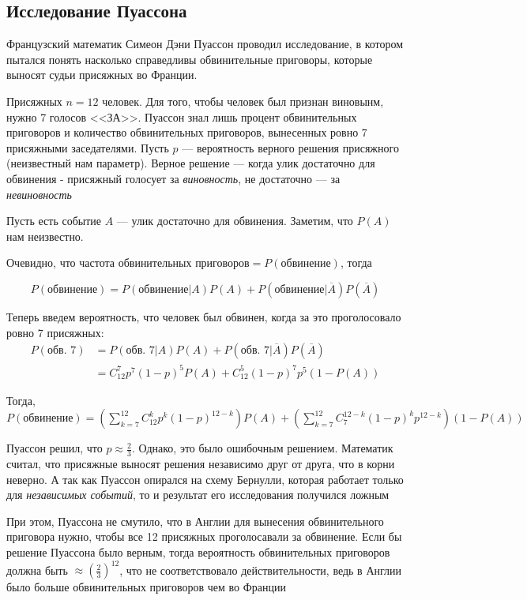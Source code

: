 \documentclass[a4paper, 10pt]{article}
\begin{document}
\subsection{Исследование Пуассона}
Французский математик Симеон Дэни Пуассон проводил исследование, в котором пытался понять насколько справедливы обвинительные приговоры, которые выносят судьи присяжных во Франции.

Присяжных $n=12$ человек. Для того, чтобы человек был признан виновынм, нужно 7 голосов <<ЗА>>. Пуассон знал лишь процент обвинительных приговоров и количество обвинительных приговоров, вынесенных ровно 7 присяжными заседателями. Пусть $p$ — вероятность верного решения присяжного (неизвестный нам параметр). Верное решение — когда улик достаточно для обвинения - присяжный голосует за \textit{виновность}, не достаточно — за \textit{невиновность}

Пусть есть событие $A$ — улик достаточно для обвинения. Заметим, что $P(A)$ нам неизвестно.

Очевидно, что частота обвинительных приговоров$=P(\text{обвинение})$, тогда

$$P(\text{обвинение})=P(\text{обвинение}|A)P(A)+P(\text{обвинение}|\overline{A})P(\overline{A})$$

Теперь введем вероятность, что человек был обвинен, когда за это проголосовало ровно 7 присяжных:
\begin{equation*}
    \begin{aligned}
        P(\text{обв. 7})&=P(\text{обв. 7}|A)P(A)+P(\text{обв. 7}|\overline{A})P(\overline{A})\\
        &=C_{12}^7 p^7(1-p)^5P(A)+C_{12}^5(1-p)^7p^5(1-P(A))
    \end{aligned}
\end{equation*}

Тогда, $P(\text{обвинение})=\left(\sum_{k=7}^{12} C_{12}^k p^k(1-p)^{12-k}\right)P(A)+\left(\sum_{k=7}^{12} C_7^{12-k}(1-p)^kp^{12-k}\right)(1-P(A))$

Пуассон решил, что $p\approx\displaystyle\frac{2}{3}$. Однако, это было ошибочным решением. Математик считал, что присяжные выносят решения независимо друг от друга, что в корни неверно. А так как Пуассон опирался на схему Бернулли, которая работает только для \textit{независимых событий}, то и результат его исследования получился ложным

При этом, Пуассона не смутило, что в Англии для вынесения обвинительного приговора нужно, чтобы все 12 присяжных проголосавали за обвинение. Если бы решение Пуассона было верным, тогда вероятность обвинительных приговоров должна быть $\approx\left(\frac{2}{3}\right)^{12}$, что не соответствовало действительности, ведь в Англии было больше обвинительных приговоров чем во Франции
\end{document}
